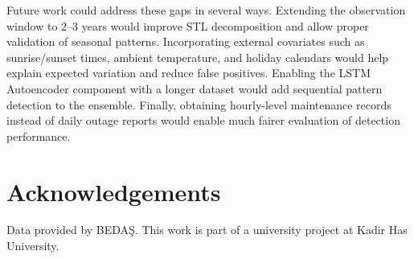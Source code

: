 \documentclass{article}
\begin{document}
Future work could address these gaps in several ways. Extending the observation window to 2--3 years would improve STL decomposition and allow proper validation of seasonal patterns. Incorporating external covariates such as sunrise/sunset times, ambient temperature, and holiday calendars would help explain expected variation and reduce false positives. Enabling the LSTM Autoencoder component with a longer dataset would add sequential pattern detection to the ensemble. Finally, obtaining hourly-level maintenance records instead of daily outage reports would enable much fairer evaluation of detection performance.


\section*{Acknowledgements}
Data provided by BEDA\c{S}. This work is part of a university project at Kadir Has University.
\end{document}
